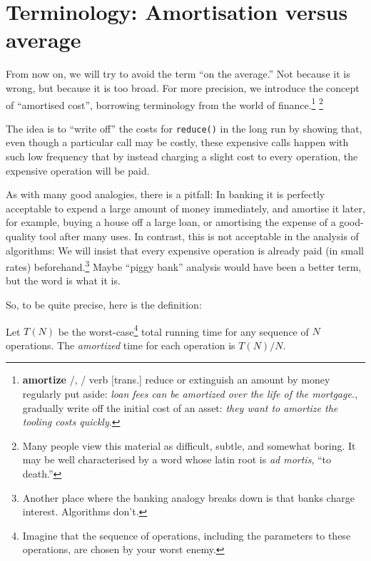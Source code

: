 \documentclass{tstextbook}
\begin{document}
 

\section{Terminology: Amortisation versus average}

From now on, we will try to avoid the term ``on the average.'' 
Not because it is wrong, but because it is too broad.
For more precision, we introduce the concept of ``amortised cost'',
borrowing terminology from the world of finance.\footnote{
{\bf amortize} 
/, /
verb [trans.]
reduce or extinguish an amount by money regularly put aside:
\emph{loan fees can be amortized over the life of the mortgage.}, gradually write off the initial cost of an asset: \emph{they want to amortize the tooling costs quickly}.
}
\footnote{Many people view this material as  difficult, subtle, and somewhat
boring. It may be well
characterised by a word whose latin root is \emph{ad mortis}, ``to death.''}

The idea is to ``write off'' the costs for {\tt reduce()} in the long
run by showing that, even though a particular call may be costly,
these expensive calls happen with such low frequency that by instead
charging a slight cost to every operation, the expensive operation
will be paid.

As with many good analogies, there is a pitfall: 
In banking it is perfectly acceptable to expend a large amount of
money immediately, and amortise it later, for example, buying a house
off a large loan, or amortising the expense of a good-quality tool
after many uses.
In contrast, this is not acceptable in the analysis of algorithms:
We will insist that every expensive operation is already paid (in
small rates) beforehand.\footnote{Another place where the banking
  analogy breaks down is that banks charge interest. Algorithms don't.}
Maybe ``piggy bank'' analysis would have been a better term, but the
word is what it is.

So, to be quite precise, here is the definition:

  \begin{definition}
    Let $T(N)$ be the worst-case\footnote{
      Imagine that the sequence of operations, including the parameters to these operations, are chosen by your worst enemy.}
    total running time for any sequence of $N$ operations.
    The \emph{amortized} time for each operation is $T(N)/N$.
\end{definition}
\end{document}
